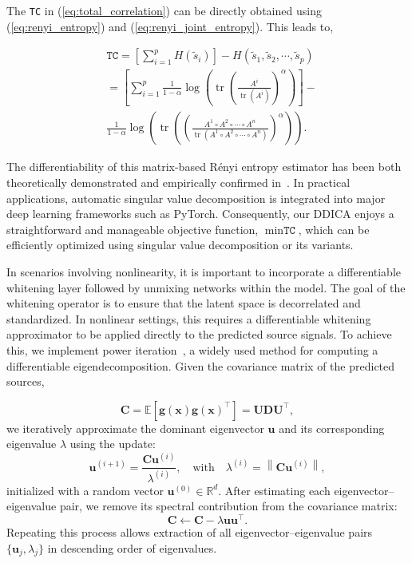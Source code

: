 \documentclass{article}
\begin{document}
The \texttt{TC} in (\ref{eq:total_correlation}) can be directly obtained using (\ref{eq:renyi_entropy}) and (\ref{eq:renyi_joint_entropy}). This leads to,

\begin{equation}
\begin{aligned}
&\texttt{TC}= \left[\sum_{i=1}^p H(\tilde{s}_i)\right] - H(\tilde{s}_1,\tilde{s}_2,\cdots,\tilde{s}_p) \\
& =\left[\sum_{i=1}^p \frac{1}{1-\alpha} \log \left(\operatorname{tr}\left(\frac{A^i}{\operatorname{tr}\left(A^i\right)}\right)^\alpha\right)\right] -\\
&\frac{1}{1-\alpha} \log \left(\operatorname{tr}\left(\left(\frac{A^1 \circ A^2 \circ \cdots \circ A^n}{\operatorname{tr}\left(A^1 \circ A^2 \circ \cdots \circ A^n\right)}\right)^\alpha\right)\right).
\end{aligned}
\end{equation}

The differentiability of this matrix-based R\'enyi entropy estimator has been both theoretically demonstrated and empirically confirmed in~\cite{yu2021measuring}. In practical applications, automatic singular value decomposition is integrated into major deep learning frameworks such as PyTorch. Consequently, our DDICA enjoys a straightforward and manageable objective function, \(\min \texttt{TC}\), which can be efficiently optimized using singular value decomposition or its variants. 

In scenarios involving nonlinearity, it is important to incorporate a differentiable whitening layer followed by unmixing networks within the model. The goal of the whitening operator is to ensure that the latent space is decorrelated and standardized. In nonlinear settings, this requires a differentiable whitening approximator to be applied directly to the predicted source signals. To achieve this, we implement power iteration~\cite{vonmises1929gleichungsaufloesung}, a widely used method for computing a differentiable eigendecomposition. Given the covariance matrix of the predicted sources, 

\begin{equation}
\mathbf{C} = \mathbb{E}[\mathbf{g}(\mathbf{x}) \mathbf{g}(\mathbf{x})^\top] = \mathbf{U} \mathbf{D} \mathbf{U}^\top,
\end{equation}
we iteratively approximate the dominant eigenvector \( \mathbf{u} \) and its corresponding eigenvalue \( \lambda \) using the update:
\begin{equation}
    \mathbf{u}^{(i+1)} = \frac{\mathbf{C} \mathbf{u}^{(i)}}{\lambda^{(i)}}, \quad \text{with} \quad \lambda^{(i)} = \left\| \mathbf{C} \mathbf{u}^{(i)} \right\|,
\end{equation}
initialized with a random vector \( \mathbf{u}^{(0)} \in \mathbb{R}^{d} \). After estimating each eigenvector–eigenvalue pair, we remove its spectral contribution from the covariance matrix:
\begin{equation}
    \mathbf{C} \gets \mathbf{C} - \lambda \mathbf{u} \mathbf{u}^\top.
\end{equation}
Repeating this process allows extraction of all eigenvector–eigenvalue pairs \( \{ \mathbf{u}_j, \lambda_j \} \) in descending order of eigenvalues.
\end{document}
